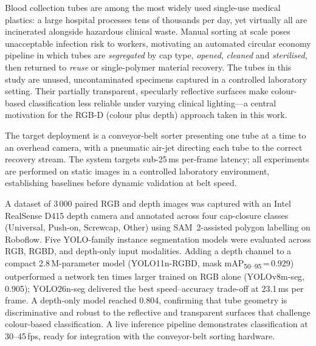 Blood collection tubes are among the most widely used single-use medical plastics: a large hospital processes tens of thousands per day, yet virtually all are incinerated alongside hazardous clinical waste. Manual sorting at scale poses unacceptable infection risk to workers, motivating an automated circular economy pipeline in which tubes are \emph{segregated} by cap type, \emph{opened}, \emph{cleaned} and \emph{sterilised}, then returned to \emph{reuse} or single-polymer material recovery. The tubes in this study are unused, uncontaminated specimens captured in a controlled laboratory setting. Their partially transparent, specularly reflective surfaces make colour-based classification less reliable under varying clinical lighting---a central motivation for the RGB-D (colour plus depth) approach taken in this work.

The target deployment is a conveyor-belt sorter presenting one tube at a time to an overhead camera, with a pneumatic air-jet directing each tube to the correct recovery stream. The system targets sub-25\,ms per-frame latency; all experiments are performed on static images in a controlled laboratory environment, establishing baselines before dynamic validation at belt speed.

A dataset of 3\,000 paired RGB and depth images was captured with an Intel RealSense D415 depth camera and annotated across four cap-closure classes (Universal, Push-on, Screwcap, Other) using SAM~2-assisted polygon labelling on Roboflow. Five YOLO-family instance segmentation models were evaluated across RGB, RGBD, and depth-only input modalities. Adding a depth channel to a compact 2.8\,M-parameter model (YOLO11n-RGBD, mask mAP\textsubscript{50--95}\,=\,0.929) outperformed a network ten times larger trained on RGB alone (YOLOv8m-seg, 0.905); YOLO26n-seg delivered the best speed--accuracy trade-off at 23.1\,ms per frame. A depth-only model reached 0.804, confirming that tube geometry is discriminative and robust to the reflective and transparent surfaces that challenge colour-based classification. A live inference pipeline demonstrates classification at 30--45\,fps, ready for integration with the conveyor-belt sorting hardware.

